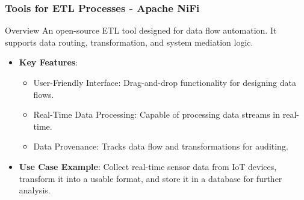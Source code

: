 \documentclass{beamer}
\begin{document}
\begin{frame}[fragile]
    \frametitle{Tools for ETL Processes - Apache NiFi}
    \begin{block}{Overview}
        An open-source ETL tool designed for data flow automation. It supports data routing, transformation, and system mediation logic.
    \end{block}
    \begin{itemize}
        \item \textbf{Key Features}:
        \begin{itemize}
            \item User-Friendly Interface: Drag-and-drop functionality for designing data flows.
            \item Real-Time Data Processing: Capable of processing data streams in real-time.
            \item Data Provenance: Tracks data flow and transformations for auditing.
        \end{itemize}
        \item \textbf{Use Case Example}: Collect real-time sensor data from IoT devices, transform it into a usable format, and store it in a database for further analysis.
    \end{itemize}
\end{frame}
\end{document}
